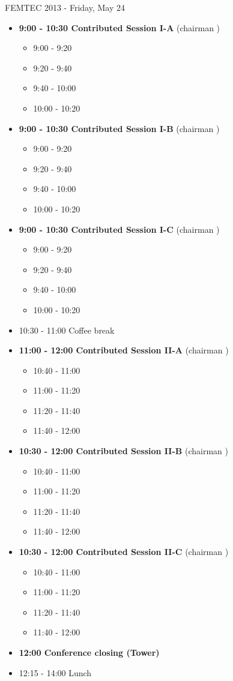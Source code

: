 \documentclass[10pt, A4]{article}
\begin{document}
\centerline{\huge FEMTEC 2013 - Friday, May 24}
\vspace{4mm}
\begin{itemize}    
\item {\bf 9:00 - 10:30 Contributed Session I-A} (chairman ) 
  \begin{itemize}
    \item 9:00 - 9:20 
    \item 9:20 - 9:40 
    \item 9:40 - 10:00 
    \item 10:00 - 10:20  
  \end{itemize}
  \item {\bf 9:00 - 10:30 Contributed Session I-B} (chairman ) 
  \begin{itemize}
    \item 9:00 - 9:20 
    \item 9:20 - 9:40 
    \item 9:40 - 10:00 
    \item 10:00 - 10:20      
  \end{itemize}
    \item {\bf 9:00 - 10:30 Contributed Session I-C} (chairman ) 
  \begin{itemize}
    \item 9:00 - 9:20 
    \item 9:20 - 9:40 
    \item 9:40 - 10:00 
    \item 10:00 - 10:20      
  \end{itemize}
  \item 10:30 - 11:00 Coffee break
  \item {\bf 11:00 - 12:00 Contributed Session II-A} (chairman ) 
  \begin{itemize}
    \item 10:40 - 11:00 
    \item 11:00 - 11:20 
    \item 11:20 - 11:40 
    \item 11:40 - 12:00 
  \end{itemize}
  \item {\bf 10:30 - 12:00 Contributed Session II-B} (chairman ) 
  \begin{itemize}
    \item 10:40 - 11:00 
    \item 11:00 - 11:20 
    \item 11:20 - 11:40 
    \item 11:40 - 12:00  
  \end{itemize}
  \item {\bf 10:30 - 12:00 Contributed Session II-C} (chairman ) 
  \begin{itemize}
    \item 10:40 - 11:00 
    \item 11:00 - 11:20 
    \item 11:20 - 11:40 
    \item 11:40 - 12:00 
  \end{itemize}
  \item {\bf 12:00 Conference closing (Tower)}
  \item 12:15 - 14:00 Lunch
\newpage
\end{itemize}
\end{document}
